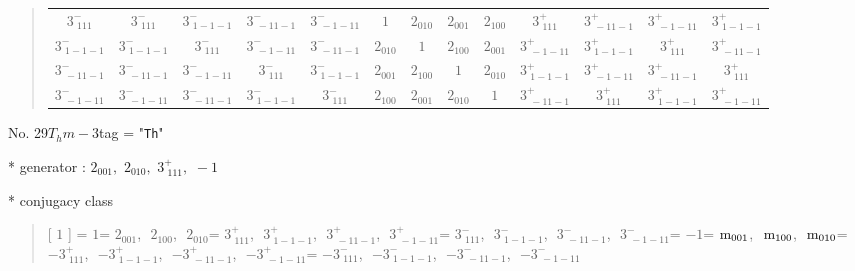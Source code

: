 \documentclass[fleqn,10pt,landscape]{jsarticle}
\begin{document}
\begin{quote}
\begin{tabular}{ccccccccccccc}
$ 3^{-}_{\,\,111} $ & $ 3^{-}_{\,\,111} $ & $ 3^{-}_{\,\,1-1-1} $ & $ 3^{-}_{\,\,-11-1} $ & $ 3^{-}_{\,\,-1-11} $ & $ 1 $ & $ 2{}_{010} $ & $ 2{}_{001} $ & $ 2{}_{100} $ & $ 3^{+}_{\,\,111} $ & $ 3^{+}_{\,\,-11-1} $ & $ 3^{+}_{\,\,-1-11} $ & $ 3^{+}_{\,\,1-1-1} $ \\
$ 3^{-}_{\,\,1-1-1} $ & $ 3^{-}_{\,\,1-1-1} $ & $ 3^{-}_{\,\,111} $ & $ 3^{-}_{\,\,-1-11} $ & $ 3^{-}_{\,\,-11-1} $ & $ 2{}_{010} $ & $ 1 $ & $ 2{}_{100} $ & $ 2{}_{001} $ & $ 3^{+}_{\,\,-1-11} $ & $ 3^{+}_{\,\,1-1-1} $ & $ 3^{+}_{\,\,111} $ & $ 3^{+}_{\,\,-11-1} $ \\
$ 3^{-}_{\,\,-11-1} $ & $ 3^{-}_{\,\,-11-1} $ & $ 3^{-}_{\,\,-1-11} $ & $ 3^{-}_{\,\,111} $ & $ 3^{-}_{\,\,1-1-1} $ & $ 2{}_{001} $ & $ 2{}_{100} $ & $ 1 $ & $ 2{}_{010} $ & $ 3^{+}_{\,\,1-1-1} $ & $ 3^{+}_{\,\,-1-11} $ & $ 3^{+}_{\,\,-11-1} $ & $ 3^{+}_{\,\,111} $ \\
$ 3^{-}_{\,\,-1-11} $ & $ 3^{-}_{\,\,-1-11} $ & $ 3^{-}_{\,\,-11-1} $ & $ 3^{-}_{\,\,1-1-1} $ & $ 3^{-}_{\,\,111} $ & $ 2{}_{100} $ & $ 2{}_{001} $ & $ 2{}_{010} $ & $ 1 $ & $ 3^{+}_{\,\,-11-1} $ & $ 3^{+}_{\,\,111} $ & $ 3^{+}_{\,\,1-1-1} $ & $ 3^{+}_{\,\,-1-11} $ \\
 \hline \hline
\end{tabular}
\end{quote}

\newpage

No. 29\quad$T_{h}$\quad$m-3$\quad[ cubic ]
tag = "{\tt Th}"

* generator : $2{}_{001},\,\,2{}_{010},\,\,3^{+}_{\,\,111},\,\,-1$

* conjugacy class
\begin{quote}
[ $1$ ] = \quad $1$\newline[ $2{}_{001}$ ] = \quad $2{}_{001}$,\,\, $2{}_{100}$,\,\, $2{}_{010}$\newline[ $3^{+}_{\,\,111}$ ] = \quad $3^{+}_{\,\,111}$,\,\, $3^{+}_{\,\,1-1-1}$,\,\, $3^{+}_{\,\,-11-1}$,\,\, $3^{+}_{\,\,-1-11}$\newline[ $3^{-}_{\,\,111}$ ] = \quad $3^{-}_{\,\,111}$,\,\, $3^{-}_{\,\,1-1-1}$,\,\, $3^{-}_{\,\,-11-1}$,\,\, $3^{-}_{\,\,-1-11}$\newline[ $-1$ ] = \quad $-1$\newline[ ${\rm m}_{001}$ ] = \quad ${\rm m}_{001}$,\,\, ${\rm m}_{100}$,\,\, ${\rm m}_{010}$\newline[ $-3^{+}_{\,\,111}$ ] = \quad $-3^{+}_{\,\,111}$,\,\, $-3^{+}_{\,\,1-1-1}$,\,\, $-3^{+}_{\,\,-11-1}$,\,\, $-3^{+}_{\,\,-1-11}$\newline[ $-3^{-}_{\,\,111}$ ] = \quad $-3^{-}_{\,\,111}$,\,\, $-3^{-}_{\,\,1-1-1}$,\,\, $-3^{-}_{\,\,-11-1}$,\,\, $-3^{-}_{\,\,-1-11}$\newline
\end{quote}
\end{document}
